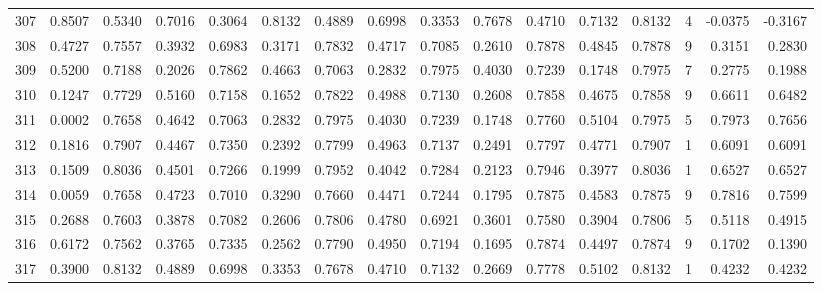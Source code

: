 \begin{tabular}{lrrrrrrrrrrrrrrr}
307 &      0.8507 &  0.5340 &  0.7016 &  0.3064 &  0.8132 &  0.4889 &  0.6998 &  0.3353 &  0.7678 &  0.4710 &   0.7132 &     0.8132 &      4 &                   -0.0375 &                    -0.3167 \\
308 &      0.4727 &  0.7557 &  0.3932 &  0.6983 &  0.3171 &  0.7832 &  0.4717 &  0.7085 &  0.2610 &  0.7878 &   0.4845 &     0.7878 &      9 &                    0.3151 &                     0.2830 \\
309 &      0.5200 &  0.7188 &  0.2026 &  0.7862 &  0.4663 &  0.7063 &  0.2832 &  0.7975 &  0.4030 &  0.7239 &   0.1748 &     0.7975 &      7 &                    0.2775 &                     0.1988 \\
310 &      0.1247 &  0.7729 &  0.5160 &  0.7158 &  0.1652 &  0.7822 &  0.4988 &  0.7130 &  0.2608 &  0.7858 &   0.4675 &     0.7858 &      9 &                    0.6611 &                     0.6482 \\
311 &      0.0002 &  0.7658 &  0.4642 &  0.7063 &  0.2832 &  0.7975 &  0.4030 &  0.7239 &  0.1748 &  0.7760 &   0.5104 &     0.7975 &      5 &                    0.7973 &                     0.7656 \\
312 &      0.1816 &  0.7907 &  0.4467 &  0.7350 &  0.2392 &  0.7799 &  0.4963 &  0.7137 &  0.2491 &  0.7797 &   0.4771 &     0.7907 &      1 &                    0.6091 &                     0.6091 \\
313 &      0.1509 &  0.8036 &  0.4501 &  0.7266 &  0.1999 &  0.7952 &  0.4042 &  0.7284 &  0.2123 &  0.7946 &   0.3977 &     0.8036 &      1 &                    0.6527 &                     0.6527 \\
314 &      0.0059 &  0.7658 &  0.4723 &  0.7010 &  0.3290 &  0.7660 &  0.4471 &  0.7244 &  0.1795 &  0.7875 &   0.4583 &     0.7875 &      9 &                    0.7816 &                     0.7599 \\
315 &      0.2688 &  0.7603 &  0.3878 &  0.7082 &  0.2606 &  0.7806 &  0.4780 &  0.6921 &  0.3601 &  0.7580 &   0.3904 &     0.7806 &      5 &                    0.5118 &                     0.4915 \\
316 &      0.6172 &  0.7562 &  0.3765 &  0.7335 &  0.2562 &  0.7790 &  0.4950 &  0.7194 &  0.1695 &  0.7874 &   0.4497 &     0.7874 &      9 &                    0.1702 &                     0.1390 \\
317 &      0.3900 &  0.8132 &  0.4889 &  0.6998 &  0.3353 &  0.7678 &  0.4710 &  0.7132 &  0.2669 &  0.7778 &   0.5102 &     0.8132 &      1 &                    0.4232 &                     0.4232 \\

\end{tabular}
